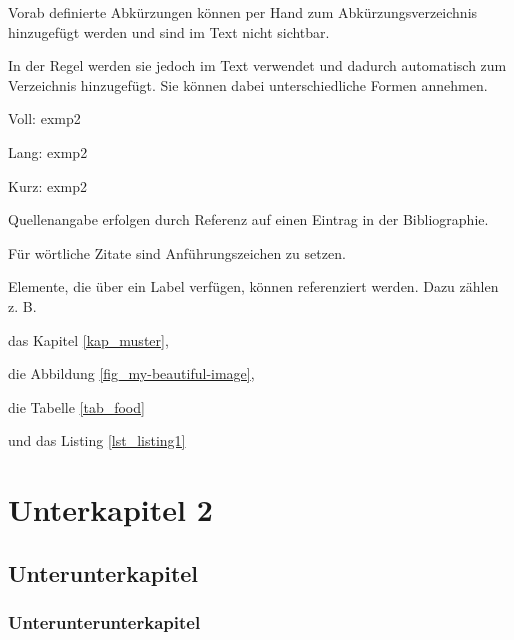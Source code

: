 Vorab definierte Abkürzungen können per Hand zum Abkürzungsverzeichnis hinzugefügt werden und sind im Text nicht sichtbar.


In der Regel werden sie jedoch im Text verwendet und dadurch automatisch zum Verzeichnis hinzugefügt.
Sie können dabei unterschiedliche Formen annehmen.

Voll: \acrfull{exmp2}

Lang: \acrlong{exmp2}

Kurz: \acrshort{exmp2}

Quellenangabe erfolgen durch Referenz auf einen Eintrag in der Bibliographie.

\cite{Wright2010}
    
Für wörtliche Zitate sind Anführungszeichen zu setzen.


Elemente, die über ein Label verfügen, können referenziert werden. Dazu zählen z. B.

das Kapitel \ref{kap_muster},

die Abbildung \ref{fig_my-beautiful-image},

die Tabelle \ref{tab_food}

und das Listing \ref{lst_listing1}

\section{Unterkapitel 2} \label{kap_unterkapitel2}
\lipsum[1-5]

\subsection{Unterunterkapitel} \label{kap_unterunterkapitel}
\lipsum[1-5]

\subsubsection{Unterunterunterkapitel} \label{kap_unterunterunterkapitel}
\lipsum[1-5]
